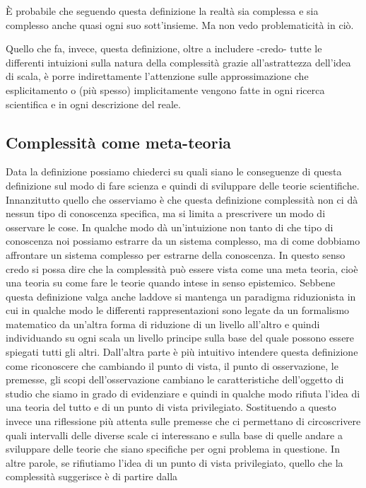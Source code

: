 \documentclass[a4paper, headings=standardclasses]{scrartcl}
\begin{document}
È probabile che seguendo questa definizione la realtà sia complessa e sia complesso anche quasi ogni suo sott'insieme. Ma non vedo problematicità in ciò.

Quello che fa, invece, questa definizione, oltre a includere -credo- tutte le differenti intuizioni sulla natura della complessità grazie all'astrattezza dell'idea di scala, è porre indirettamente l'attenzione sulle approssimazione che esplicitamento o (più spesso) implicitamente vengono fatte in ogni ricerca scientifica e in ogni descrizione del reale.

\subsection{Complessità come meta-teoria}
Data la definizione possiamo chiederci su quali siano le conseguenze di questa definizione
sul modo di fare scienza e quindi di sviluppare delle teorie scientifiche.
Innanzitutto quello che osserviamo è che questa definizione complessità non ci dà
nessun tipo di conoscenza specifica, ma si limita a prescrivere un modo di osservare le cose.
In qualche modo dà un'intuizione non tanto di che tipo di conoscenza noi possiamo estrarre
da un sistema complesso, ma di come dobbiamo affrontare un sistema complesso per estrarne
della conoscenza. In questo senso credo si possa dire che la complessità può essere vista
come una meta teoria, cioè una teoria su come fare le teorie quando intese in senso epistemico.
Sebbene questa definizione valga anche laddove si mantenga un paradigma riduzionista in cui
in qualche modo le differenti rappresentazioni sono legate da un formalismo matematico da un'altra
forma di riduzione di un livello all'altro e quindi individuando su ogni scala un livello
principe sulla base del quale possono essere spiegati tutti gli altri. Dall'altra parte è
più intuitivo intendere questa definizione come riconoscere che cambiando il punto di vista,
il punto di osservazione, le premesse, gli scopi dell'osservazione cambiano le caratteristiche
dell'oggetto di studio che siamo in grado di evidenziare e quindi in qualche modo rifiuta
l'idea di una teoria del tutto e di un punto di vista privilegiato. Sostituendo a questo invece
una riflessione più attenta sulle premesse che ci permettano di circoscrivere quali intervalli
delle diverse scale ci interessano e sulla base di quelle andare a sviluppare delle teorie che siano
specifiche per ogni problema in questione. In altre parole, se rifiutiamo l'idea di un
punto di vista privilegiato, quello che la complessità suggerisce è di partire dalla
\end{document}
